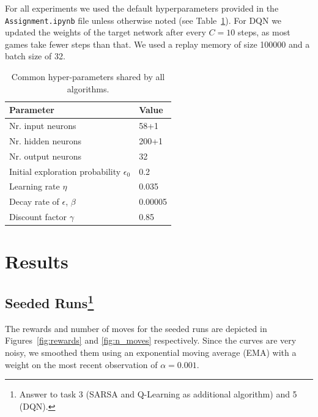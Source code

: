 \documentclass[conference]{IEEEtran}
\begin{document}
For all experiments we used the default hyperparameters provided in the \verb"Assignment.ipynb" file unless otherwise noted (see Table~\ref{tab:hyper-parameters}).
For DQN we updated the weights of the target network after every $C=10$ steps, as most games take fewer steps than that. We used a replay memory of size 100000 and a batch size of 32.


\begin{table}[h!]
    \centering
    \begin{tabular}{|l|l|}
    \hline
    \textbf{Parameter}                & \textbf{Value} \\ \hline
    Nr. input neurons                 & 58+1           \\ \hline
    Nr. hidden neurons                & 200+1          \\ \hline
    Nr. output neurons                & 32             \\ \hline
    Initial exploration probability $\epsilon_0$      & 0.2            \\ \hline
    Learning rate $\eta$              & 0.035          \\ \hline
    Decay rate of $\epsilon$, $\beta$ & 0.00005        \\ \hline
    Discount factor $\gamma$          & 0.85           \\ \hline
    \end{tabular}
    \caption{Common hyper-parameters shared by all algorithms.}
    \label{tab:hyper-parameters}
\end{table}




\section{Results}\label{sec:results}

\subsection{Seeded Runs\footnote{Answer to task 3 (SARSA and Q-Learning as additional algorithm) and 5 (DQN).}}



The rewards and number of moves for the seeded runs are depicted in Figures~\ref{fig:rewards} and \ref{fig:n_moves} respectively. Since the curves are very noisy, we smoothed them using an exponential moving average (EMA) with a weight on the most recent observation of $\alpha = 0.001$.
\end{document}
